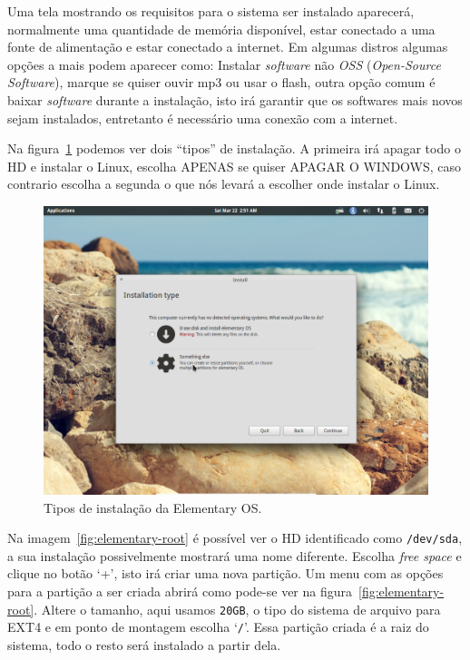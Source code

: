 \documentclass{handout_utfpr}
\begin{document}
Uma tela mostrando os requisitos para o sistema ser instalado aparecerá, normalmente uma quantidade de memória disponível, estar conectado a uma fonte de alimentação e estar conectado a internet. Em algumas distros algumas opções a mais podem aparecer como: Instalar \textit{software} não \textit{OSS} (\textit{Open-Source Software}), marque se quiser ouvir mp3 ou usar o flash, outra opção comum é baixar \textit{software} durante a instalação, isto irá garantir que os softwares mais novos sejam instalados, entretanto é necessário uma conexão com a internet.

Na figura~\ref{fig:elementary-install} podemos ver dois ``tipos'' de instalação. A primeira irá apagar todo o HD e instalar o Linux, escolha APENAS se quiser APAGAR O WINDOWS, caso contrario escolha a segunda o que nós levará a escolher onde instalar o Linux.

\begin{figure}[H]
  \centering
  \includegraphics[scale=.3]{imagens/elementary-install-03.png}
  \caption{Tipos de instalação da Elementary OS\@.}
  \label{fig:elementary-install}
\end{figure}

Na imagem~\ref{fig:elementary-root} é possível ver o HD identificado como \texttt{/dev/sda}, a sua instalação possivelmente mostrará uma nome diferente. Escolha \textit{free space} e clique no botão `+', isto irá criar uma nova partição. Um menu com as opções para a partição a ser criada abrirá como pode-se ver na figura~\ref{fig:elementary-root}. Altere o tamanho, aqui usamos \texttt{20GB}, o tipo do sistema de arquivo para EXT4 e em ponto de montagem escolha `\texttt{/}'. Essa partição criada é a raiz do sistema, todo o resto será instalado a partir dela.
\end{document}
